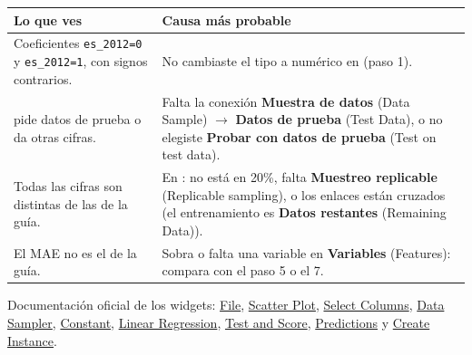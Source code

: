 \documentclass[11pt]{article}
\newcommand{\urlwfile}{https://orangedatamining.com/widget-catalog/data/file/}
\newcommand{\urlwscatter}{https://orangedatamining.com/widget-catalog/visualize/scatterplot/}
\newcommand{\urlwcolumns}{https://orangedatamining.com/widget-catalog/transform/selectcolumns/}
\newcommand{\urlwsampler}{https://orangedatamining.com/widget-catalog/transform/datasampler/}
\newcommand{\urlwconstant}{https://orangedatamining.com/widget-catalog/model/constant/}
\newcommand{\urlwlinear}{https://orangedatamining.com/widget-catalog/model/linearregression/}
\newcommand{\urlwtest}{https://orangedatamining.com/widget-catalog/evaluate/testandscore/}
\newcommand{\urlwpred}{https://orangedatamining.com/widget-catalog/evaluate/predictions/}
\newcommand{\urlwcreate}{https://orangedatamining.com/widget-catalog/transform/createinstance/}
\newcommand{\menu}[2]{\textbf{#1} {\color{black!55}(#2)}}
\newcommand{\widget}[1]{\leavevmode{\color{esumerNavyDark}\textbf{#1}}}
\begin{document}
\small
\renewcommand{\arraystretch}{1.15}
\begin{tabularx}{\textwidth}{@{}>{\raggedright\arraybackslash}p{6.2cm} >{\raggedright\arraybackslash}X@{}}
\toprule
\textbf{Lo que ves} & \textbf{Causa más probable}\\
\midrule
Coeficientes \texttt{es\_2012=0} y \texttt{es\_2012=1}, con signos contrarios. & No cambiaste el tipo a numérico en \widget{File} (paso 1).\\
\widget{Test and Score} pide datos de prueba o da otras cifras. & Falta la conexión \menu{Muestra de datos}{Data Sample} $\rightarrow$ \menu{Datos de prueba}{Test Data}, o no elegiste \menu{Probar con datos de prueba}{Test on test data}.\\
Todas las cifras son distintas de las de la guía. & En \widget{Data Sampler}: no está en 20\%, falta \menu{Muestreo replicable}{Replicable sampling}, o los enlaces están cruzados (el entrenamiento es \menu{Datos restantes}{Remaining Data}).\\
El MAE no es el de la guía. & Sobra o falta una variable en \menu{Variables}{Features}: compara con el paso 5 o el 7.\\
\bottomrule
\end{tabularx}\par
\renewcommand{\arraystretch}{1.0}
\normalsize

\vspace{4pt}
{\footnotesize Documentación oficial de los widgets:
\href{\urlwfile}{\color{esumerOrange}File},
\href{\urlwscatter}{\color{esumerOrange}Scatter Plot},
\href{\urlwcolumns}{\color{esumerOrange}Select Columns},
\href{\urlwsampler}{\color{esumerOrange}Data Sampler},
\href{\urlwconstant}{\color{esumerOrange}Constant},
\href{\urlwlinear}{\color{esumerOrange}Linear Regression},
\href{\urlwtest}{\color{esumerOrange}Test and Score},
\href{\urlwpred}{\color{esumerOrange}Predictions} y
\href{\urlwcreate}{\color{esumerOrange}Create Instance}.}
\end{document}
